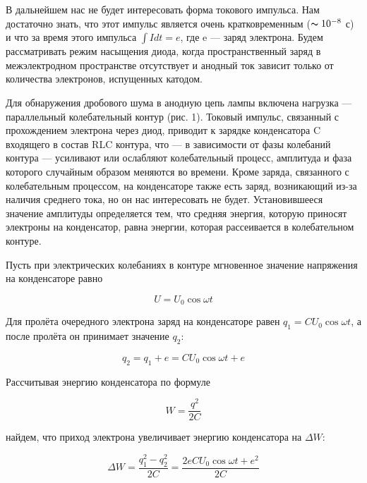 \documentclass[12pt,a4paper]{article}
\begin{document}
\par В дальнейшем нас не будет интересовать форма токового импульса. Нам достаточно знать, что этот импульс является очень кратковременным ($\thicksim 10^{-8}$ с) и что за время этого импульса 
$\int{Idt} = e$, где e — заряд электрона. Будем рассматривать режим насыщения диода, когда пространственный заряд в межэлектродном пространстве отсутствует и анодный ток зависит только от количества электронов, испущенных катодом. 

\par Для обнаружения дробового шума в анодную цепь лампы включена нагрузка — параллельный колебательный контур (рис. 1). Токовый импульс, связанный с прохождением электрона через диод, приводит к зарядке конденсатора C входящего в состав RLC контура, что — в зависимости от фазы колебаний контура — усиливают или ослабляют колебательный процесс, амплитуда и фаза которого случайным образом меняются во времени. Кроме заряда, связанного с колебательным процессом, на конденсаторе также есть заряд, возникающий из-за наличия среднего тока, но он нас интересовать не будет. Установившееся значение амплитуды определяется тем, что средняя энергия, которую приносят электроны на конденсатор, равна энергии, которая рассеивается в колебательном контуре.

\par Пусть при электрических колебаниях в контуре мгновенное значение напряжения на конденсаторе равно

\begin{equation}\label{U}
U = U_0\cos\omega{t}
\end{equation}

\par Для пролёта очередного электрона заряд на конденсаторе равен $q_1 = CU_0\cos\omega{t}$, а после пролёта он принимает значение $q_2$:

\begin{equation} \label{q2}
q_2 = q_1 + e = CU_0\cos\omega{t} + e
\end{equation}

\par Рассчитывая энергию конденсатора по формуле 

\begin{equation}\label{W}
W = \frac{q^2}{2C}
\end{equation} 

найдем, что приход электрона увеличивает энергию конденсатора на $\Delta{W}$:

\begin{equation}\label{dW}
\Delta{W} = \frac{q_1^2-q_2^2}{2C} = \frac{2eCU_0\cos\omega{t} + e^2}{2C}
\end{equation}
\end{document}
